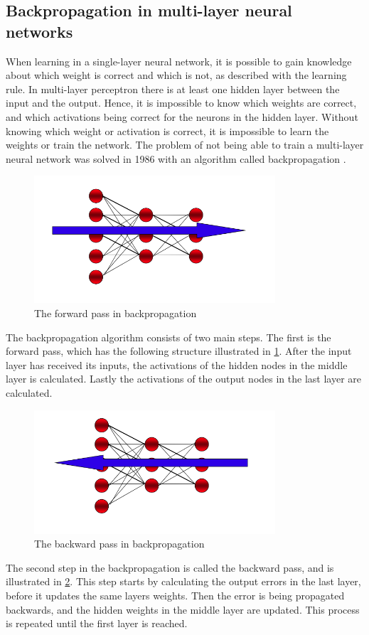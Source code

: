\documentclass[USenglish]{ifimaster}  %
\begin{document}
\subsection{Backpropagation in multi-layer neural networks}
When learning in a single-layer neural network, it is possible to gain knowledge about which weight is correct and which is not, as described with the learning rule. In multi-layer perceptron there is at least one hidden layer between the input and the output. Hence, it is impossible to know which weights are correct, and which activations being correct for the neurons in the hidden layer. Without knowing which weight or activation is correct, it is impossible to learn the weights or train the network. The problem of not being able to train a multi-layer neural network was solved in 1986 with an algorithm called backpropagation \cite{Rumelhart:1986:LIR:104279.104293}.
\begin{figure}[ht]
    \centering
    \includegraphics[width=0.8\textwidth]{bilder/forward_prop.png}
    \caption{The forward pass in backpropagation \cite{website:inf_4490_mlp}}
    \label{fig:forward_step}
\end{figure}
The backpropagation algorithm consists of two main steps. The first is the forward pass, which has the following structure illustrated in \cref{fig:forward_step}. After the input layer has received its inputs, the activations of the hidden nodes in the middle layer is calculated. Lastly the activations of the output nodes in the last layer are calculated. 
\begin{figure}[ht]
    \centering
    \includegraphics[width=0.8\textwidth]{bilder/backward_prop.png}
    \caption{The backward pass in backpropagation \cite{website:inf_4490_mlp}}
    \label{fig:backward_step}
\end{figure}
The second step in the backpropagation is called the backward pass, and is illustrated in \cref{fig:backward_step}. This step starts by calculating the output errors in the last layer, before it updates the same layers weights. Then the error is being propagated backwards, and the hidden weights in the middle layer are updated. This process is repeated until the first layer is reached.
\end{document}
